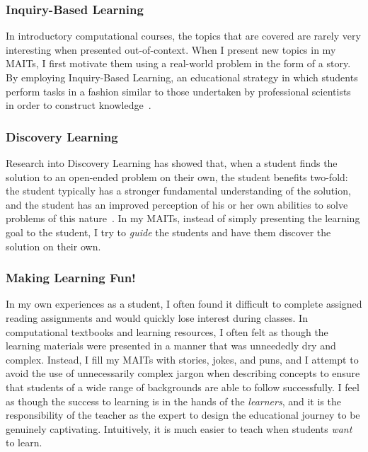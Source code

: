 \subsubsection{Inquiry-Based Learning}
In introductory computational courses, the topics that are covered are rarely very interesting when presented out-of-context. When I present new topics in my \glspl{MAIT}, I first motivate them using a real-world problem in the form of a story. By employing Inquiry-Based Learning, an educational strategy in which students perform tasks in a fashion similar to those undertaken by professional scientists in order to construct knowledge~\cite{Pedaste2015}.

\subsubsection{Discovery Learning}
Research into Discovery Learning has showed that, when a student finds the solution to an open-ended problem on their own, the student benefits two-fold: the student typically has a stronger fundamental understanding of the solution, and the student has an improved perception of his or her own abilities to solve problems of this nature~\cite{Bruner1961}. In my \glspl{MAIT}, instead of simply presenting the learning goal to the student, I try to \textit{guide} the students and have them discover the solution on their own.

\subsubsection{Making Learning Fun!}
In my own experiences as a student, I often found it difficult to complete assigned reading assignments and would quickly lose interest during classes. In computational textbooks and learning resources, I often felt as though the learning materials were presented in a manner that was unneededly dry and complex. Instead, I fill my \glspl{MAIT} with stories, jokes, and puns, and I attempt to avoid the use of unnecessarily complex jargon when describing concepts to ensure that students of a wide range of backgrounds are able to follow successfully. I feel as though the success to learning is in the hands of the \textit{learners}, and it is the responsibility of the teacher as the expert to design the educational journey to be genuinely captivating. Intuitively, it is much easier to teach when students \textit{want} to learn.

